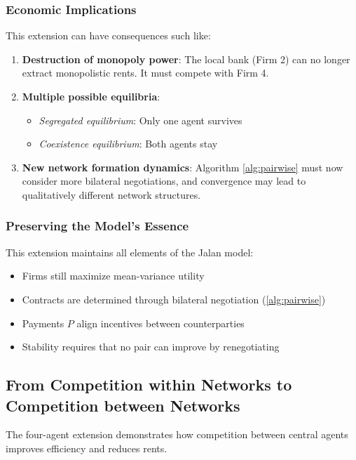 \subsubsection{Economic Implications}

This extension can have consequences such like:

\begin{enumerate}
    \item \textbf{Destruction of monopoly power}: The local bank (Firm 2) can no longer extract monopolistic rents. It must compete with Firm 4.
        
    \item \textbf{Multiple possible equilibria}:
    \begin{itemize}
        \item \textit{Segregated equilibrium}: Only one agent survives 
        \item \textit{Coexistence equilibrium}: Both agents stay
    \end{itemize}
    
    \item \textbf{New network formation dynamics}: Algorithm  \ref{alg:pairwise} must now consider more bilateral negotiations, and convergence may lead to qualitatively different network structures.
\end{enumerate}

\subsubsection{Preserving the Model's Essence}

This extension maintains all elements of the Jalan model:
\begin{itemize}
    \item Firms still maximize mean-variance utility
    \item Contracts are determined through bilateral negotiation (\ref{alg:pairwise})
    \item Payments $P$ align incentives between counterparties
    \item Stability requires that no pair can improve by renegotiating
\end{itemize}

\subsection{From Competition within Networks to Competition between Networks}

The four-agent extension demonstrates how competition between central agents improves efficiency and reduces rents. 

